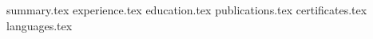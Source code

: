 \documentclass[12pt, a4paper]{awesome-cv}
\newcommand*{\sectiondir}{resume/}
\begin{document}
\makecvheader

{summary.tex}
{experience.tex}
{education.tex}
{publications.tex}
{certificates.tex}
{languages.tex}
\end{document}
